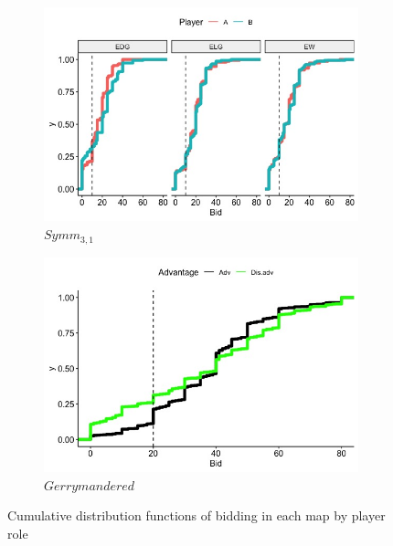 \documentclass[AER]{AEA}
\begin{document}
\begin{figure}
    
    \begin{subfigure}[t]{0.45\textwidth}
        \centering
        \includegraphics[scale = .35]{symm_3_1_cdf.jpeg} 
        \caption{$Symm_{3,1}$} \label{fig:symm_3_1_cdf}
    \end{subfigure}
    \hfill
    \begin{subfigure}[t]{0.45\textwidth}
        \centering
        \includegraphics[scale = .35]{adv_vs_disadv_cdf.jpeg} 
        \caption{$Gerrymandered$} \label{fig:adv_vs_disadv_cdf}
    \end{subfigure}
    \caption{Cumulative distribution functions of bidding in each map by player role}
\label{fig:cdfs}
\end{figure}
\end{document}
